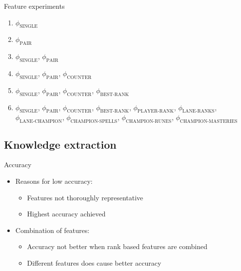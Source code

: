 \begin{frame}{Feature experiments}
\begin{minipage}{0.55\linewidth} 


\end{minipage}    
\begin{minipage}{0.40\linewidth}
\footnotesize{
\begin{enumerate}
\item $\phi_\text{SINGLE}$
\item $\phi_\text{PAIR}$
\item $\phi_\text{SINGLE}$, $\phi_\text{PAIR}$
\item $\phi_\text{SINGLE}$, $\phi_\text{PAIR}$, $\phi_\text{COUNTER}$
\item $\phi_\text{SINGLE}$, $\phi_\text{PAIR}$, $\phi_\text{COUNTER}$, $\phi_\text{BEST-RANK}$
\item $\phi_\text{SINGLE}$, $\phi_\text{PAIR}$, $\phi_\text{COUNTER}$, $\phi_\text{BEST-RANK}$, $\phi_\text{PLAYER-RANK}$, $\phi_\text{LANE-RANKS}$, $\phi_\text{LANE-CHAMPION}$, $\phi_\text{CHAMPION-SPELLS}$, $\phi_\text{CHAMPION-RUNES}$, $\phi_\text{CHAMPION-MASTERIES}$
\end{enumerate}
}
\end{minipage}
\end{frame}


\subsection{Knowledge extraction}
\begin{frame}{Accuracy}
\begin{itemize}
\item Reasons for low accuracy:
\begin{itemize}
\item Features not thoroughly  representative
\item Highest accuracy achieved
\end{itemize}
\item Combination of features:
\begin{itemize}
\item Accuracy not better when rank based features are combined
\item Different features does cause better accuracy
\end{itemize}
\end{itemize}
\end{frame}

